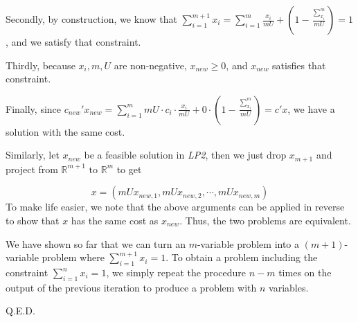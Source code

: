 Secondly, by construction, we know that $\sum_{i=1}^{m+1}x_i=\sum_{i=1}^{m}\frac{x_i}{mU}+(1 - \frac{\sum_{x_i}^{m}}{mU})=1$, and we satisfy that constraint.

Thirdly, because $x_i, m, U$ are non-negative, $x_{new}\geq 0$, and $x_{new}$ satisfies that constraint.

Finally, since $c_{new}'x_{new}=\sum_{i=1}^m mU\cdot c_i\cdot \frac{x_i}{mU} + 0\cdot (1 - \frac{\sum_{x_i}^{m}}{mU})=c'x$, we have a solution with the same cost.


Similarly, let $x_{new}$ be a feasible solution in \textit{LP2}, then we just drop $x_{m+1}$ and project from $\mathbb{R}^{m+1} \text{ to } \mathbb{R}^m$ to get

\[ x = (mUx_{new,1}, mUx_{new, 2}, \cdots, mUx_{new, m})\]
To make life easier, we note that the above arguments can be applied in reverse to show that $x$ has the same cost as $x_{new}$. Thus, the two problems are equivalent.

We have shown so far that we can turn an $m$-variable problem into a $(m+1)$-variable problem where $\sum_{i=1}^{m+1}x_i=1$. To obtain a problem including the constraint $\sum_{i=1}^nx_i=1$, we simply repeat the procedure $n-m$ times on the output of the previous iteration to produce a problem with $n$ variables.

Q.E.D.